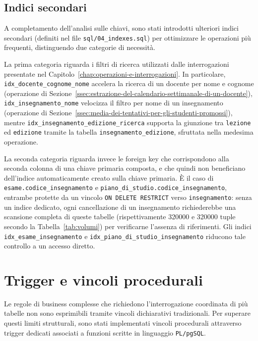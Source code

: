 \subsection{Indici secondari}
\label{ssec:indici-secondari}

A completamento dell'analisi sulle chiavi, sono stati introdotti ulteriori indici secondari (definiti nel file \texttt{sql/04\_indexes.sql}) per ottimizzare le operazioni più frequenti, distinguendo due categorie di necessità.

La prima categoria riguarda i filtri di ricerca utilizzati dalle interrogazioni presentate nel Capitolo~\ref{chap:operazioni-e-interrogazioni}. In particolare, \texttt{idx\_docente\_cognome\_nome} accelera la ricerca di un docente per nome e cognome (operazione di Sezione~\ref{ssec:estrazione-del-calendario-settimanale-di-un-docente}), \texttt{idx\_insegnamento\_nome} velocizza il filtro per nome di un insegnamento (operazione di Sezione~\ref{ssec:media-dei-tentativi-per-gli-studenti-promossi}), mentre \texttt{idx\_insegnamento\_edizione\_ricerca} supporta la giunzione tra \texttt{lezione} ed \texttt{edizione} tramite la tabella \texttt{insegnamento\_edizione}, sfruttata nella medesima operazione.

La seconda categoria riguarda invece le foreign key che corrispondono alla seconda colonna di una chiave primaria composta, e che quindi non beneficiano dell'indice automaticamente creato sulla chiave primaria. È il caso di \texttt{esame.codice\_insegnamento} e \texttt{piano\_di\_studio.codice\_insegnamento}, entrambe protette da un vincolo \texttt{ON DELETE RESTRICT} verso \texttt{insegnamento}: senza un indice dedicato, ogni cancellazione di un insegnamento richiederebbe una scansione completa di queste tabelle (rispettivamente \num{320000} e \num{320000} tuple secondo la Tabella~\ref{tab:volumi}) per verificarne l'assenza di riferimenti. Gli indici \texttt{idx\_esame\_insegnamento} e \texttt{idx\_piano\_di\_studio\_insegnamento} riducono tale controllo a un accesso diretto.

\section{Trigger e vincoli procedurali}
\label{sec:trigger-e-vincoli-procedurali}

Le regole di business complesse che richiedono l'interrogazione coordinata di più tabelle non sono esprimibili tramite vincoli dichiarativi tradizionali. Per superare questi limiti strutturali, sono stati implementati vincoli procedurali attraverso trigger dedicati associati a funzioni scritte in linguaggio \texttt{PL/pgSQL}.

